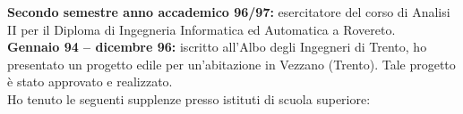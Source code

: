 {\bf Secondo semestre anno accademico 96/97:}
esercitatore del corso di Analisi II
per il Diploma di Ingegneria Informatica ed Automatica a Rovereto.\\

{\bf Gennaio 94 -- dicembre 96:}
iscritto all'Albo degli Ingegneri di Trento,
ho presentato un progetto edile
per un'abitazione in Vezzano (Trento).
Tale progetto \`e stato approvato e realizzato.\\


%
%
%
Ho tenuto le seguenti supplenze
presso istituti di scuola superiore:\\


